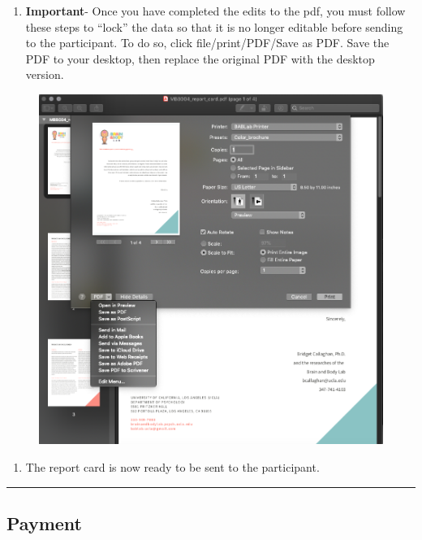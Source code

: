\documentclass[]{book}
\providecommand{\tightlist}{%
  \setlength{\itemsep}{0pt}\setlength{\parskip}{0pt}}
\begin{document}
\begin{enumerate}
\def\labelenumi{\arabic{enumi}.}
\setcounter{enumi}{5}
\tightlist
\item
  \textbf{Important}- Once you have completed the edits to the pdf, you must follow these steps to ``lock'' the data so that it is no longer editable before sending to the participant. To do so, click file/print/PDF/Save as PDF. Save the PDF to your desktop, then replace the original PDF with the desktop version.
\end{enumerate}

\begin{figure}
\centering
\includegraphics{images/report_card_online/6.png}
\caption{}
\end{figure}

\begin{enumerate}
\def\labelenumi{\arabic{enumi}.}
\setcounter{enumi}{6}
\tightlist
\item
  The report card is now ready to be sent to the participant.
\end{enumerate}

\begin{center}\rule{0.5\linewidth}{0.5pt}\end{center}

\hypertarget{payment}{%
\subsection{Payment}\label{payment}}
\end{document}
